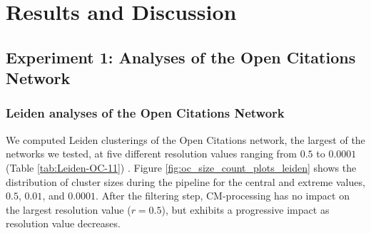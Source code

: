\documentclass[11pt]{article}   	%
\begin{document}
\section{Results and Discussion}
\label{sec:results-discussion}

\subsection{Experiment 1: Analyses of the Open Citations Network}

\subsubsection{Leiden analyses of the Open Citations Network}
We computed Leiden clusterings of the Open Citations network, the largest of the networks we tested, at five different resolution values ranging from $0.5$ to $0.0001$ (Table \ref{tab:Leiden-OC-11}) . Figure \ref{fig:oc_size_count_plots_leiden} shows the distribution of cluster sizes during the pipeline for the central and extreme values, $0.5$, $0.01$, and $0.0001$. After the filtering step, CM-processing  has no impact on the largest resolution value ($r=0.5$), but exhibits a progressive impact as resolution value decreases.
\end{document}
